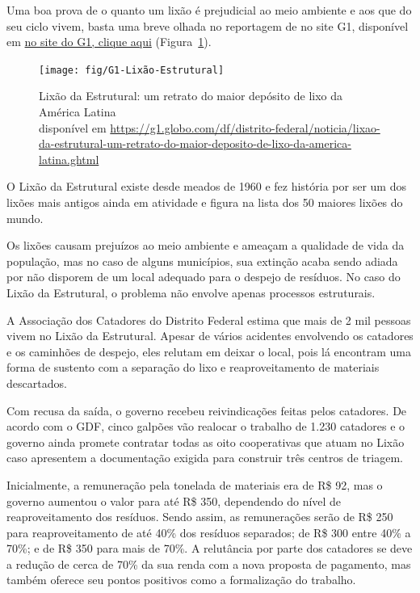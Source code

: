 Uma boa prova de o quanto um lixão é prejudicial ao meio ambiente e aos que do seu ciclo vivem, basta uma breve olhada no reportagem de  no site G1, disponível em \href{https://g1.globo.com/df/distrito-federal/noticia/lixao-da-estrutural-um-retrato-do-maior-deposito-de-lixo-da-america-latina.ghtml}{no site do G1, clique aqui} (Figura~\ref{fig:g1-lixao-estrutural}). \nocite{Marques2018}

\begin{figure}[h!]
    \centering
    \texttt{[image: fig/G1-Lixão-Estrutural]}
    \caption[Lixão da Estrutural]{Lixão da Estrutural: um retrato do maior depósito de lixo da América Latina \\ disponível em \url{https://g1.globo.com/df/distrito-federal/noticia/lixao-da-estrutural-um-retrato-do-maior-deposito-de-lixo-da-america-latina.ghtml}}
    \label{fig:g1-lixao-estrutural}
\end{figure}

O Lixão da Estrutural existe desde meados de 1960 e fez história por ser um dos lixões mais antigos ainda em atividade e figura na lista dos 50 maiores lixões do mundo.

Os lixões causam prejuízos ao meio ambiente e ameaçam a qualidade de vida da população, mas no caso de alguns municípios, sua extinção acaba sendo adiada por não disporem de um local adequado para o despejo de resíduos. No caso do Lixão da Estrutural, o problema não envolve apenas processos estruturais.

A Associação dos Catadores do Distrito Federal estima que mais de 2 mil pessoas vivem no Lixão da Estrutural. Apesar de vários acidentes envolvendo os catadores e os caminhões de despejo, eles relutam em deixar o local, pois lá encontram uma forma de sustento com a separação do lixo e reaproveitamento de materiais descartados.

Com recusa da saída, o governo recebeu reivindicações feitas pelos catadores. De acordo com o GDF, cinco galpões vão realocar o trabalho de 1.230 catadores e o governo ainda promete contratar todas as oito cooperativas que atuam no Lixão caso apresentem a documentação exigida para construir três centros de triagem.

Inicialmente, a remuneração pela tonelada de materiais era de R\$ 92, mas o governo aumentou o valor para até R\$ 350, dependendo do nível de reaproveitamento dos resíduos. Sendo assim, as remunerações serão de R\$ 250 para reaproveitamento de até 40\% dos resíduos separados; de R\$ 300 entre 40\% a 70\%; e de R\$ 350 para mais de 70\%. A relutância por parte dos catadores se deve a redução de cerca de 70\% da sua renda com a nova proposta de pagamento, mas  também oferece seu pontos positivos como a formalização do trabalho. \nocite{CidadesInteligentes2018Lixao}

